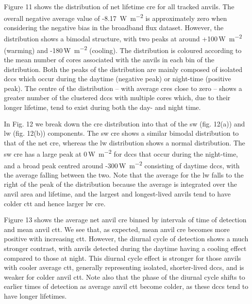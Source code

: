 Figure 11 shows the distribution of net lifetime \acrshort{cre} for all tracked
anvils. The overall negative average value of -8.17
\,\unit{W m^{-2}} is approximately zero when considering the
negative bias in the broadband flux dataset. However, the distribution
shows a bimodal structure, with two peaks at around
+100\,\unit{W m^{-2}} (warming) and -180\,\unit{W m^{-2}}
(cooling). The distribution is coloured according to the mean number of
cores associated with the anvils in each bin of the distribution. Both
the peaks of the distribution are mainly composed of isolated \acrshort{dcc}s which
occur during the daytime (negative peak) or night-time (positive peak).
The centre of the distribution -- with average \acrshort{cre}s close to zero --
shows a greater number of the clustered \acrshort{dcc}s with multiple cores which,
due to their longer lifetime, tend to exist during both the day- and
night time.

In Fig. 12 we break down the \acrshort{cre} distribution into that of the \acrshort{sw} (fig.
12(a)) and \acrshort{lw} (fig. 12(b)) components. The \acrshort{sw} \acrshort{cre} shows a similar
bimodal distribution to that of the net \acrshort{cre}, whereas the \acrshort{lw} distribution
shows a normal distribution. The \acrshort{sw} \acrshort{cre} has a large peak at
0\,\unit{W m^{-2}} for \acrshort{dcc}s that occur during the night-time, and a
broad peak centred around -300\,\unit{W m^{-2}} consisting of
daytime \acrshort{dcc}s, with the average falling between the two. Note that the
average for the \acrshort{lw} falls to the right of the peak of the distribution
because the average is integrated over the anvil area and lifetime, and
the largest and longest-lived anvils tend to have colder \acrshort{ctt} and hence
larger \acrshort{lw} \acrshort{cre}.

Figure 13 shows the average net anvil \acrshort{cre} binned by intervals of time of
detection and mean anvil \acrshort{ctt}. We see that, as expected, mean anvil \acrshort{cre}
becomes more positive with increasing \acrshort{ctt}. However, the diurnal cycle of
detection shows a much stronger contrast, with anvils detected during
the daytime having a cooling effect compared to those at night. This
diurnal cycle effect is stronger for those anvils with cooler average
\acrshort{ctt}, generally representing isolated, shorter-lived \acrshort{dcc}s, and is weaker
for colder anvil \acrshort{ctt}. Note also that the phase of the diurnal cycle
shifts to earlier times of detection as average anvil \acrshort{ctt} become colder,
as these \acrshort{dcc}s tend to have longer lifetimes.

